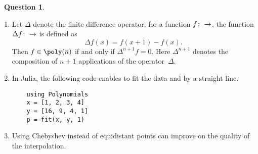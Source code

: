 \documentclass[10pt]{article}
\theoremstyle{definition}
\newtheorem{question}{{\normalfont \faGears}~Question}
\theoremstyle{remark}
\begin{document}
\begin{question}
\begin{enumerate}
        \item
            Let $\Delta$ denote the finite difference operator:
            for a function $f \colon \real \to \real$,
            the function $\Delta f \colon \real \to \real$ is defined as
            \[
                \Delta f(x) = f(x + 1) - f(x).
            \]
            Then $f \in \poly(n)$ if and only if $\Delta^{n+1} f = 0$.
            Here $\Delta^{n+1}$ denotes the composition of $n+1$ applications of the operator~$\Delta$.

        \item
            In Julia, the following code enables to fit the data  and  by a straight line.
            \begin{verbatim}
    using Polynomials
    x = [1, 2, 3, 4]
    y = [16, 9, 4, 1]
    p = fit(x, y, 1)
            \end{verbatim}

        \item
            Using Chebyshev instead of equidistant points can improve on the quality of the interpolation.
\end{enumerate}
\end{question}
\end{document}
